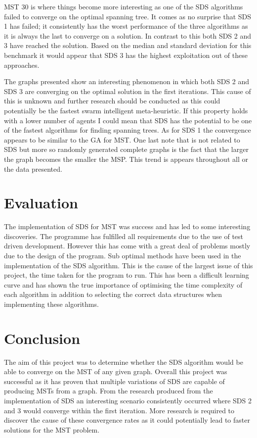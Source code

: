 \documentclass{AISB2008}
\begin{document}
{MST 30 is where things become more interesting as one of the SDS algorithms failed to converge on the optimal spanning tree. It comes as no surprise that SDS 1 has failed; it consistently has the worst performance of the three algorithms as it is always the last to converge on a solution. In contrast to this both SDS 2 and 3 have reached the solution. Based on the median and standard deviation for this benchmark it would appear that SDS 3 has the highest exploitation out of these approaches. 

The graphs presented show an interesting phenomenon in which both SDS 2 and SDS 3 are converging on the optimal solution in the first iterations. This cause of this is unknown and further research should be conducted as this could potentially be the fastest swarm intelligent meta-heuristic. If this property holds with a lower number of agents I could mean that SDS has the potential to be one of the fastest algorithms for finding spanning trees. As for SDS 1 the convergence appears to be similar to the GA for MST.
One last note that is not related to SDS but more so randomly generated complete graphs is the fact that the larger the graph becomes the smaller the MSP. This trend is appears throughout all or the data presented. 



\section{Evaluation}

The implementation of SDS for MST was success and has led to some interesting discoveries. The programme has fulfilled all requirements due to the use of test driven development. However this has come with a great deal of problems mostly due to the design of the program. Sub optimal methods have been used in the implementation of the SDS algorithm. This is the cause of the largest issue of this project, the time taken for the program to run. This has been a difficult learning curve and has shown the true importance of optimising the time complexity of each algorithm in addition to selecting the correct data structures when implementing these algorithms.


\section{Conclusion}

The aim of this project was to determine whether the SDS algorithm would be able to converge on the MST of any given graph. Overall this project was successful as it has proven that multiple variations of SDS are capable of producing MSTs from a graph. From the research produced from the implementation of SDS an interesting scenario consistently occurred where SDS 2 and 3 would converge within the first iteration. More research is required to discover the cause of these convergence rates as it could potentially lead to faster solutions for the MST problem.


}
\end{document}
